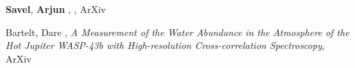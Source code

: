 \item[{\color{numcolor}\scriptsize2}] \textbf{Savel}, \textbf{Arjun} , , ArXiv

\item[{\color{numcolor}\scriptsize1}] Bartelt, Dare , \emph{A Measurement of the Water Abundance in the Atmosphere of the Hot Jupiter WASP-43b with High-resolution Cross-correlation Spectroscopy}, ArXiv